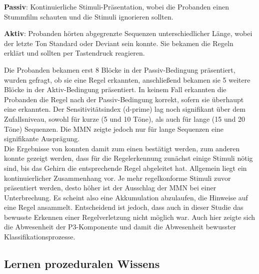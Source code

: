 \documentclass[doc,a4paper,12pt]{apa6}
\begin{document}
\begin{compactitem}
  \item \textbf{Passiv}: Kontinuierliche Stimuli-Präsentation, wobei die Probanden einen Stummfilm schauten und die Stimuli ignorieren sollten.
  \item \textbf{Aktiv}: Probanden hörten abgegrenzte Sequenzen unterschiedlicher Länge, wobei der letzte Ton Standard oder Deviant sein konnte. Sie bekamen die Regeln erklärt und sollten per Tastendruck reagieren.
\end{compactitem}

Die Probanden bekamen erst 8 Blöcke in der Passiv-Bedingung präsentiert, wurden gefragt, ob sie eine Regel erkannten, anschließend bekamen sie 5 weitere Blöcke in der Aktiv-Bedingung präsentiert. In keinem Fall erkannten die Probanden die Regel nach der Passiv-Bedingung korrekt, sofern sie überhaupt eine erkannten. Der Sensitivitätsindex (d-prime) lag noch signifikant über dem Zufallsniveau, sowohl für kurze (5 und 10 Töne), als auch für lange (15 und 20 Töne) Sequenzen. Die MMN zeigte jedoch nur für lange Sequenzen eine signifikante Ausprägung.\\
Die Ergebnisse von \textcite{paavilainen2007preattentive} konnten damit zum einen bestätigt werden, zum anderen konnte gezeigt werden, dass für die Regelerkennung zunächst einige Stimuli nötig sind, bis das Gehirn die entsprechende Regel abgeleitet hat. Allgemein liegt ein kontinuierlicher Zusammenhang vor. Je mehr regelkonforme Stimuli zuvor präsentiert werden, desto höher ist der Ausschlag der MMN bei einer Unterbrechung. Es scheint also eine Akkumulation abzulaufen, die Hinweise auf eine Regel ansammelt. Entscheidend ist jedoch, dass auch in dieser Studie das bewusste Erkennen einer Regelverletzung nicht möglich war. Auch hier zeigte sich die Abwesenheit der P3-Komponente und damit die Abwesenheit bewusster Klassifikationsprozesse.

\subsection{Lernen prozeduralen Wissens}
\end{document}
